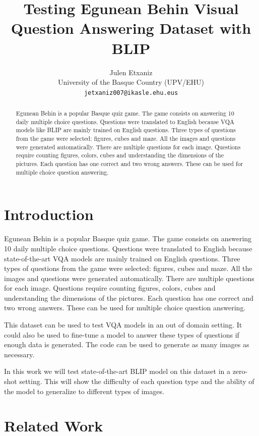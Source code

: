 \documentclass[11pt]{article}
\title{Testing Egunean Behin Visual Question Answering Dataset with BLIP}
\author{Julen Etxaniz \\
  University of the Basque Country (UPV/EHU) \\
  \texttt{jetxaniz007@ikasle.ehu.eus}}
\begin{document}
\maketitle
\begin{abstract}
Egunean Behin is a popular Basque quiz game. The game consists on answering 10 daily multiple choice questions.
Questions were translated to English because VQA models like BLIP are mainly trained on English questions.
Three types of questions from the game were selected: figures, cubes and maze. All the images and questions were generated automatically.
There are multiple questions for each image. Questions require counting figures, colors, cubes and understanding the dimensions of the pictures.
Each question has one correct and two wrong answers. These can be used for multiple choice question answering.
\end{abstract}

\section{Introduction}

Egunean Behin is a popular Basque quiz game. The game consists on answering 10 daily multiple choice questions.
Questions were translated to English because state-of-the-art VQA models are mainly trained on English questions.
Three types of questions from the game were selected: figures, cubes and maze. All the images and questions were generated automatically.
There are multiple questions for each image. Questions require counting figures, colors, cubes and understanding the dimensions of the pictures.
Each question has one correct and two wrong answers. These can be used for multiple choice question answering.

This dataset can be used to test VQA models in an out of domain setting. It could also be used to fine-tune a model to answer these types of questions if enough data is generated. The code can be used to generate as many images as necessary.

In this work we will test state-of-the-art BLIP \cite{li2022blip} model on this dataset in a zero-shot setting. This will show the difficulty of each question type and the ability of the model to generalize to different types of images.

\section{Related Work}
\end{document}
